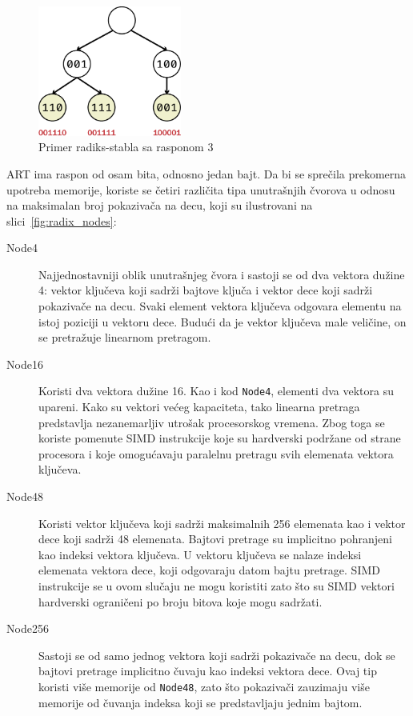 \documentclass[12pt,oneside]{memoir}
\begin{document}
\begin{figure}[!h]
  \centering
  \includegraphics[width=0.42\textwidth]{radix_span3.eps}
  \caption{Primer radiks-stabla sa rasponom 3}
  \label{fig:radix_span3}
\end{figure}

ART ima raspon od osam bita, odnosno jedan bajt. Da bi se sprečila prekomerna
upotreba memorije, koriste se četiri različita tipa unutrašnjih čvorova u odnosu
na maksimalan broj pokazivača na decu, koji su ilustrovani na
slici~\ref{fig:radix_nodes}:

\begin{description}

  \item[Node4] Najjednostavniji oblik unutrašnjeg čvora
        i sastoji se od
        dva vektora dužine 4: vektor ključeva koji sadrži bajtove ključa i
        vektor dece koji sadrži pokazivače na decu. Svaki element vektora
        ključeva odgovara elementu na istoj poziciji u vektoru dece.
        Budući da je vektor ključeva male veličine, on se pretražuje
        linearnom pretragom.
  \item[Node16] Koristi dva vektora dužine 16.
        Kao i kod \texttt{Node4}, elementi dva vektora su upareni.
        Kako su vektori većeg kapaciteta, tako linearna
        pretraga predstavlja nezanemarljiv utrošak procesorskog
        vremena. Zbog toga se koriste pomenute SIMD instrukcije koje su
        hardverski podržane od strane procesora i koje
        omogućavaju paralelnu pretragu svih elemenata vektora ključeva.
  \item[Node48]
        Koristi vektor ključeva koji sadrži maksimalnih 256 elemenata
        kao i vektor dece koji sadrži 48 elemenata.
        Bajtovi pretrage su implicitno pohranjeni kao indeksi
        vektora ključeva. U vektoru ključeva se nalaze indeksi elemenata
        vektora dece, koji odgovaraju datom bajtu pretrage.
        SIMD instrukcije se u ovom slučaju ne mogu koristiti zato što su
        SIMD vektori hardverski ograničeni po broju bitova koje mogu sadržati.
  \item[Node256] Sastoji se od samo jednog vektora koji sadrži pokazivače na decu,
        dok se bajtovi pretrage implicitno čuvaju kao indeksi vektora
        dece. Ovaj tip koristi više memorije od \texttt{Node48},
        zato što pokazivači zauzimaju više memorije od čuvanja indeksa
        koji se predstavljaju jednim bajtom.
\end{description}
\end{document}
